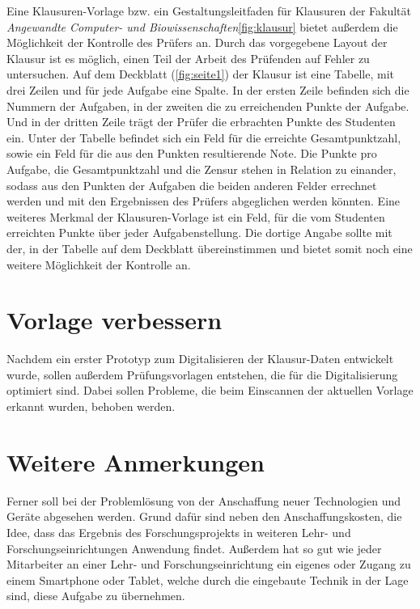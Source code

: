 \documentclass[nomenclature, oneside, 150]{HSMW-Thesis}
\begin{document}
	Eine Klausuren-Vorlage bzw. ein Gestaltungsleitfaden für Klausuren der Fakultät \textit{Angewandte Computer- und Biowissenschaften}\ref{fig:klausur} bietet außerdem die Möglichkeit der Kontrolle des Prüfers an. Durch das vorgegebene Layout der Klausur ist es möglich, einen Teil der Arbeit des Prüfenden auf Fehler zu untersuchen. Auf dem Deckblatt (\ref{fig:seite1}) der Klausur ist eine Tabelle, mit drei Zeilen und für jede Aufgabe eine Spalte. In der ersten Zeile befinden sich die Nummern der Aufgaben, in der zweiten die zu erreichenden Punkte der Aufgabe. Und in der dritten Zeile trägt der Prüfer die erbrachten Punkte des Studenten ein. Unter der Tabelle befindet sich ein Feld für die erreichte Gesamtpunktzahl, sowie ein Feld für die aus den Punkten resultierende Note. Die Punkte pro Aufgabe, die Gesamtpunktzahl und die Zensur stehen in Relation zu einander, sodass aus den Punkten der Aufgaben die beiden anderen Felder errechnet werden und mit den Ergebnissen des Prüfers abgeglichen werden könnten. Eine weiteres Merkmal der Klausuren-Vorlage ist ein Feld, für die vom Studenten erreichten Punkte über jeder Aufgabenstellung. Die dortige Angabe sollte mit der, in der Tabelle auf dem Deckblatt übereinstimmen und bietet somit noch eine weitere Möglichkeit der Kontrolle an.
	
	\section{Vorlage verbessern}
	Nachdem ein erster Prototyp zum Digitalisieren der Klausur-Daten entwickelt wurde, sollen außerdem Prüfungsvorlagen entstehen, die für die Digitalisierung optimiert sind. Dabei sollen Probleme, die beim Einscannen der aktuellen Vorlage erkannt wurden, behoben werden. 
	
	\section{Weitere Anmerkungen}
	Ferner soll bei der Problemlösung von der Anschaffung neuer Technologien und Geräte abgesehen werden. Grund dafür sind neben den Anschaffungskosten, die Idee, dass das Ergebnis des Forschungsprojekts in weiteren Lehr- und Forschungseinrichtungen Anwendung findet. Außerdem hat so gut wie jeder Mitarbeiter an einer Lehr- und Forschungseinrichtung ein eigenes oder Zugang zu einem Smartphone oder Tablet, welche durch die eingebaute Technik in der Lage sind, diese Aufgabe zu übernehmen. 

\end{document}
